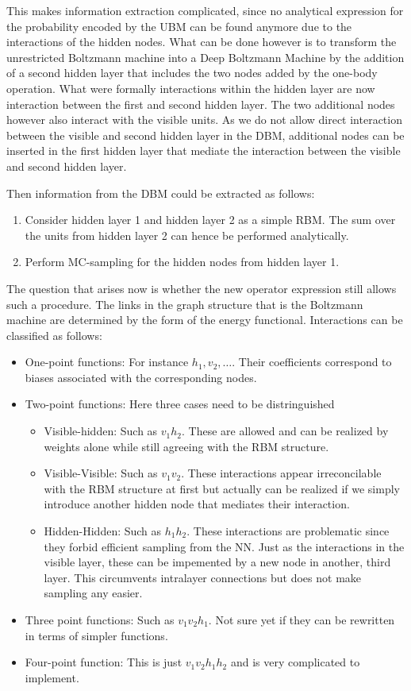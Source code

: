 \documentclass{article}
\begin{document}
This makes information extraction complicated, since no analytical expression
for the probability encoded by the UBM can be found anymore due to the
interactions of the hidden nodes. What can be done however is to transform the
unrestricted Boltzmann machine into a Deep Boltzmann Machine by the addition of
a second hidden layer that includes the two nodes added by the one-body
operation. What were formally interactions within the hidden layer are now
interaction between the first and second hidden layer. The two additional nodes
however also interact with the visible units. As we do not allow direct
interaction between the visible and second hidden layer in the DBM, additional
nodes can be inserted in the first hidden layer that mediate the interaction
between the visible and second hidden layer. \par
Then information from the DBM could be extracted as follows:
\begin{enumerate}
  \item Consider hidden layer 1 and hidden layer 2 as a simple RBM. The sum over
  the units from hidden layer 2 can hence be performed analytically.
  \item Perform MC-sampling for the hidden nodes from hidden layer 1.
\end{enumerate}
The question that arises now is whether the new operator expression still allows
such a procedure. The links in the graph structure that is the Boltzmann machine
are determined by the form of the energy functional. Interactions can be
classified as follows:
\begin{itemize}
  \item One-point functions: For instance $h_1, v_2, \hdots$. Their coefficients
  correspond to biases associated with the corresponding nodes.
  \item Two-point functions: Here three cases need to be distringuished
  \begin{itemize}
    \item Visible-hidden: Such as $v_1h_2$. These are allowed and can be realized
    by weights alone while still agreeing with the RBM structure.
    \item Visible-Visible: Such as $v_1v_2$. These interactions appear
    irreconcilable with the RBM structure at first but actually can be realized
    if we simply introduce another hidden node that mediates their interaction.
    \item Hidden-Hidden: Such as $h_1h_2$. These interactions are problematic
    since they forbid efficient sampling from the NN. Just as the interactions
    in the visible layer, these can be impemented by a new node in another,
    third layer. This circumvents intralayer connections but does not make
    sampling any easier.
  \end{itemize}
  \item Three point functions: Such as $v_1v_2h_1$. Not sure yet if they can be
  rewritten in terms of simpler functions.
  \item Four-point function: This is just $v_1v_2h_1h_2$ and is very complicated
  to implement.
\end{itemize}
\end{document}
